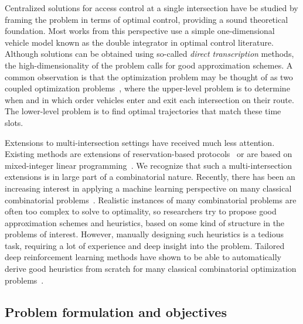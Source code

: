 \documentclass[notitlepage]{report}
\begin{document}
Centralized solutions for access control at a single intersection have be
studied by framing the problem in terms of optimal control, providing a sound
theoretical foundation. Most works from this perspective use a simple
one-dimensional vehicle model known as the double integrator in optimal control
literature. Although solutions can be obtained using so-called \textit{direct transcription}
methods, the high-dimensionality of the problem calls for good approximation
schemes. A common observation is that the optimization problem may be thought of
as two coupled optimization
problems~\cite{hultApproximateSolutionOptimal2015,zhaoBilevelProgrammingModel2021,tallapragadaHierarchicaldistributedOptimizedCoordination2017},
where the upper-level problem is to determine when and in which order vehicles
enter and exit each intersection on their route. The lower-level problem is to
find optimal trajectories that match these time slots.

Extensions to multi-intersection settings have received much less attention.
Existing methods are extensions of reservation-based
protocols~\cite{hausknechtAutonomousIntersectionManagement} or are based on
mixed-integer linear programming~\cite{sartorCombinatorialLearningTraffic2019}.
We recognize that such a multi-intersection extensions is in large part of a
combinatorial nature. Recently, there has been an increasing interest in
applying a machine learning perspective on many classical combinatorial
problems~\cite{bengioMachineLearningCombinatorial2020}. Realistic instances of many combinatorial problems are often too
complex to solve to optimality, so researchers try to propose good approximation
schemes and heuristics, based on some kind of structure in the problems of
interest. However, manually designing such heuristics is a tedious task,
requiring a lot of experience and deep insight into the problem. Tailored deep
reinforcement learning methods have shown to be able to automatically derive
good heuristics from scratch for many classical combinatorial optimization
problems~\cite{mazyavkinaReinforcementLearningCombinatorial2020}.


\subsection*{Problem formulation and objectives}
\end{document}
